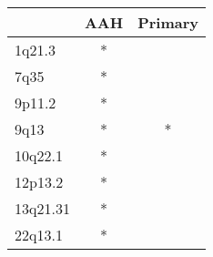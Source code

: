 \begin{tabular}{lcc}
\toprule
{} & AAH & Primary \\
\midrule
1q21.3   &   * &         \\
7q35     &   * &         \\
9p11.2   &   * &         \\
9q13     &   * &       * \\
10q22.1  &   * &         \\
12p13.2  &   * &         \\
13q21.31 &   * &         \\
22q13.1  &   * &         \\
\bottomrule
\end{tabular}
